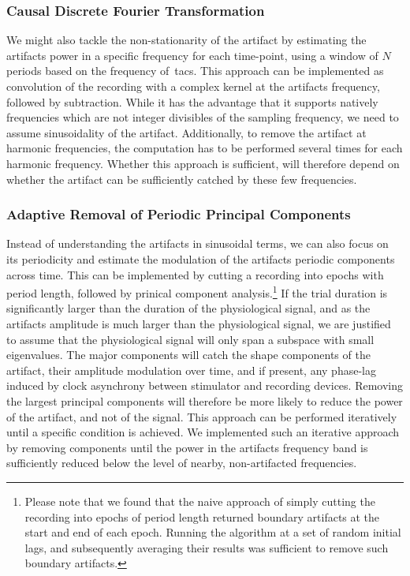 \documentclass[a4paper]{article}
\begin{document}
\subsubsection{Causal Discrete Fourier Transformation}\label{sec:causalDFT}

We might also tackle the non-stationarity of the artifact by  estimating the artifacts power in a specific frequency for each time-point, using a window of $N$ periods based on the frequency of~\gls{tacs}. This approach can be implemented as convolution of the recording with a complex kernel at the artifacts frequency, followed by subtraction.
While it has the advantage that it supports natively frequencies which are not integer divisibles of the sampling frequency, we need to assume sinusoidality of the artifact. Additionally, to remove the artifact at harmonic frequencies, the computation has to be performed several times for each harmonic frequency.
Whether this approach is sufficient, will therefore depend on whether the artifact can be sufficiently catched by these few frequencies.

\subsubsection{Adaptive Removal of Periodic Principal Components}\label{sec:adaptivePCA}

Instead of understanding the artifacts in sinusoidal terms, we can also focus on its periodicity and estimate the modulation of the artifacts periodic components across time.
This can be implemented by cutting a recording into epochs with period length, followed by prinical component analysis.\footnote{Please note that we found that the naive approach of simply cutting the recording into epochs of period length returned boundary artifacts at the start and end of each epoch. Running the algorithm at a set of random initial lags, and subsequently averaging their results was sufficient to remove such boundary artifacts.}
If the trial duration is significantly larger than the duration of the physiological signal, and as the artifacts amplitude is much larger than the physiological signal, we are justified to assume that the physiological signal will only span a subspace with small eigenvalues.
The major components will catch the shape components of the artifact, their amplitude modulation over time, and if present, any phase-lag induced by clock asynchrony between stimulator and recording devices. Removing the largest principal components will therefore be more likely to reduce the power of the artifact, and not of the signal.
This approach can be performed iteratively until a specific condition is achieved. We implemented such an iterative approach by removing components until the power in the artifacts frequency band is sufficiently reduced below the level of nearby, non-artifacted frequencies.
\end{document}

